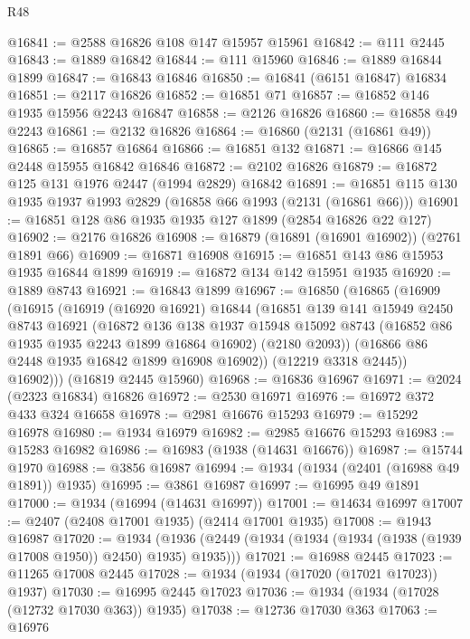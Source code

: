 \begin{lexlean}{R48}
\begin{coremodule}
@16841 := @2588 @16826 @108 @147 @15957 @15961
@16842 := @111 @2445
@16843 := @1889 @16842
@16844 := @111 @15960
@16846 := @1889 @16844 @1899
@16847 := @16843 @16846
@16850 := @16841 (@6151 @16847) @16834
@16851 := @2117 @16826
@16852 := @16851 @71
@16857 := @16852 @146 @1935 @15956 @2243 @16847
@16858 := @2126 @16826
@16860 := @16858 @49 @2243
@16861 := @2132 @16826
@16864 := @16860 (@2131 (@16861 @49))
@16865 := @16857 @16864
@16866 := @16851 @132
@16871 := @16866 @145 @2448 @15955 @16842 @16846
@16872 := @2102 @16826
@16879 := @16872 @125 @131 @1976 @2447 (@1994 @2829) @16842
@16891 := @16851 @115 @130 @1935 @1937 @1993 @2829 (@16858 @66 @1993 (@2131 (@16861 @66)))
@16901 := @16851 @128 @86 @1935 @1935 @127 @1899 (@2854 @16826 @22 @127)
@16902 := @2176 @16826
@16908 := @16879 (@16891 (@16901 @16902)) (@2761 @1891 @66)
@16909 := @16871 @16908
@16915 := @16851 @143 @86 @15953 @1935 @16844 @1899
@16919 := @16872 @134 @142 @15951 @1935
@16920 := @1889 @8743
@16921 := @16843 @1899
@16967 := @16850
    (@16865
      (@16909
        (@16915
          (@16919
            (@16920 @16921)
            @16844
            (@16851
              @139
              @141
              @15949
              @2450
              @8743
              @16921
              (@16872
                @136
                @138
                @1937
                @15948
                @15092
                @8743
                (@16852 @86 @1935 @1935 @2243 @1899 @16864 @16902)
                (@2180 @2093))
              (@16866 @86 @2448 @1935 @16842 @1899 @16908 @16902))
            (@12219 @3318 @2445))
          @16902)))
    (@16819 @2445 @15960)
@16968 := @16836 @16967
@16971 := @2024 (@2323 @16834) @16826
@16972 := @2530 @16971
@16976 := @16972 @372 @433 @324 @16658
@16978 := @2981 @16676 @15293
@16979 := @15292 @16978
@16980 := @1934 @16979
@16982 := @2985 @16676 @15293
@16983 := @15283 @16982
@16986 := @16983 (@1938 (@14631 @16676))
@16987 := @15744 @1970
@16988 := @3856 @16987
@16994 := @1934 (@1934 (@2401 (@16988 @49 @1891)) @1935)
@16995 := @3861 @16987
@16997 := @16995 @49 @1891
@17000 := @1934 (@16994 (@14631 @16997))
@17001 := @14634 @16997
@17007 := @2407 (@2408 @17001 @1935) (@2414 @17001 @1935)
@17008 := @1943 @16987
@17020 := @1934
    (@1936 (@2449 (@1934 (@1934 (@1934 (@1938 (@1939 @17008 @1950)) @2450) @1935) @1935)))
@17021 := @16988 @2445
@17023 := @11265 @17008 @2445
@17028 := @1934 (@1934 (@17020 (@17021 @17023)) @1937)
@17030 := @16995 @2445 @17023
@17036 := @1934 (@1934 (@17028 (@12732 @17030 @363)) @1935)
@17038 := @12736 @17030 @363
@17063 := @16976

\end{coremodule}
\end{lexlean}
